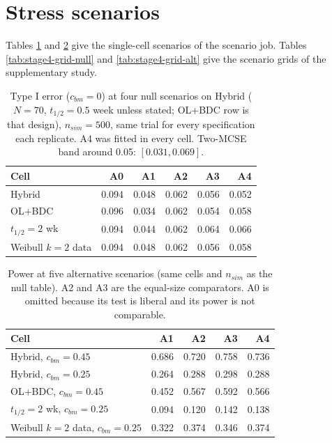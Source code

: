 \documentclass[
  11pt,
]{article}
\begin{document}
\section{Stress scenarios}\label{stress-scenarios}

Tables \ref{tab:stage4-null} and \ref{tab:stage4-alt} give the
single-cell scenarios of the scenario job. Tables
\ref{tab:stage4-grid-null} and \ref{tab:stage4-grid-alt} give the
scenario grids of the supplementary study.

\begin{table}
\centering
\caption{\label{tab:stage4-null}Type I error ($c_{bm} = 0$) at four null scenarios on
    Hybrid ($N = 70$, $t_{1/2} = 0.5$ week unless stated; OL+BDC row is
    that design), $n_{sim} = 500$, same trial for every specification
    each replicate. A4 was fitted in every cell. Two-MCSE band around
    0.05: $[0.031, 0.069]$.}
\centering
\fontsize{9}{11}\selectfont
\begin{tabular}[t]{lrrrrr}
\toprule
Cell & A0 & A1 & A2 & A3 & A4\\
\midrule
Hybrid & 0.094 & 0.048 & 0.062 & 0.056 & 0.052\\
OL+BDC & 0.096 & 0.034 & 0.062 & 0.054 & 0.058\\
$t_{1/2} = 2$ wk & 0.094 & 0.044 & 0.062 & 0.064 & 0.066\\
Weibull $k = 2$ data & 0.094 & 0.048 & 0.062 & 0.056 & 0.058\\
\bottomrule
\end{tabular}
\end{table}

\begin{table}
\centering
\caption{\label{tab:stage4-alt}Power at five alternative scenarios (same cells and
    $n_{sim}$ as the null table). A2 and A3 are the equal-size
    comparators. A0 is omitted because its test is liberal and its
    power is not comparable.}
\centering
\fontsize{9}{11}\selectfont
\begin{tabular}[t]{lrrrr}
\toprule
Cell & A1 & A2 & A3 & A4\\
\midrule
Hybrid, $c_{bm} = 0.45$ & 0.686 & 0.720 & 0.758 & 0.736\\
Hybrid, $c_{bm} = 0.25$ & 0.264 & 0.288 & 0.298 & 0.288\\
OL+BDC, $c_{bm} = 0.45$ & 0.452 & 0.567 & 0.592 & 0.566\\
$t_{1/2} = 2$ wk, $c_{bm} = 0.25$ & 0.094 & 0.120 & 0.142 & 0.138\\
Weibull $k = 2$ data, $c_{bm} = 0.25$ & 0.322 & 0.374 & 0.346 & 0.374\\
\bottomrule
\end{tabular}
\end{table}
\end{document}
